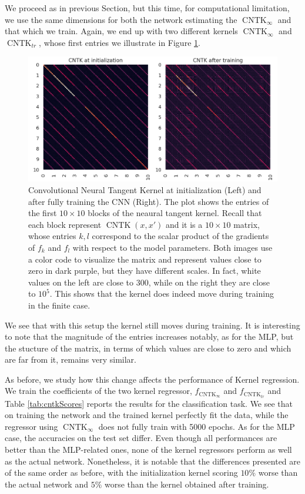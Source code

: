 \documentclass[11pt,notitlepage]{article}
\numberwithin{equation}{section}
\DeclareMathOperator{\CNTK}{CNTK}
\theoremstyle{remark}
\theoremstyle{definition}
\begin{document}
	We proceed as in previous Section, but this time, for computational limitation, we use the same dimensions for both the network estimating the $\CNTK_\infty$ and that which we train.
	Again, we end up with two different kernels $\CNTK_\infty$ and $\CNTK_{tr}$, whose first entries we illustrate in Figure \ref{fig:cntk_before_after_tr}.
	\begin{figure}
		\includegraphics[width=\linewidth]{../Simulations/figures/cntk_before_after_tr.png}
		\caption{Convolutional Neural Tangent Kernel at initialization (Left) and after fully training the CNN (Right).
		The plot shows the entries of the first $10 \times 10$ blocks of the neaural tangent kernel.
		Recall that each block represent $\CNTK(x, x')$ and it is a $10 \times 10$ matrix, whose entries $k,l$ correspond to the scalar product of the gradients of $f_k$ and $f_l$ with respect to the model parameters. 
		Both images use a color code to visualize the matrix and represent values close to zero in dark purple, but they have different scales.
		In fact, white values on the left are close to 300, while on the right they are close to $10^5$.
		This shows that the kernel does indeed move during training in the finite case.}
		\label{fig:cntk_before_after_tr}		
	\end{figure}
	
	We see that with this setup the kernel still moves during training.
	It is interesting to note that the magnitude of the entries increases notably, as for the MLP, but the stucture of the matrix, in terms of which values are close to zero and which are far from it, remains very similar.
	
    As before, we study how this change affects the performance of Kernel regression.
	We train the coefficients of the two kernel regressor, $f_{\CNTK_\infty}$ and $f_{\CNTK_{tr}}$ and
	Table \ref{tab:cntkScores} reports the results for the classification task.
	We see that on training the network and the trained kernel perfectly fit the data, while the regressor using $\CNTK_\infty$ does not fully train with 5000 epochs.
	As for the MLP case, the accuracies on the test set differ.
	Even though all performances are better than the MLP-related ones, none of the kernel regressors perform as well as the actual network.
	Nonetheless, it is notable that the differences presented are of the same order as before, with the initialization kernel scoring $10\%$ worse than the actual network and $5\%$ worse than the kernel obtained after training.
	
\end{document}
